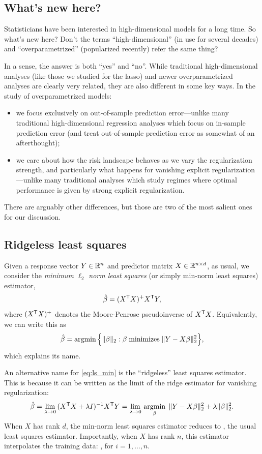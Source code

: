 \documentclass{article}
\begin{document}
\subsection{What's new here?}

Statisticians have been interested in high-dimensional models for a long
time. So what's new here? Don't the terms ``high-dimensional'' (in use for
several decades) and ``overparametrized'' (popularized recently) refer the same
thing?    

In a sense, the answer is both ``yes'' and ``no''. While traditional
high-dimensional analyses (like those we studied for the lasso) and newer
overparametrized analyses are clearly very related, they are also different in
some key ways. In the study of overparametrized models:
\begin{itemize}
\item we focus exclusively on out-of-sample prediction error---unlike many 
  traditional high-dimensional regression analyses which focus on in-sample
  prediction error (and treat out-of-sample prediction error as somewhat of an 
  afterthought);  
\item we care about how the risk landscape behaves as we vary the regularization  
  strength, and particularly what happens for vanishing explicit
  regularization---unlike many traditional analyses which study regimes where
  optimal performance is given by strong explicit regularization.   
\end{itemize}
There are arguably other differences, but those are two of the most salient ones 
for our discussion.

\subsection{Ridgeless least squares}

Given a response vector $Y \in \mathbb{R}^n$ and predictor matrix $X \in \mathbb{R}^{n \times
  d}$, as usual, we consider the \emph{minimum $\ell_2$ norm least squares} 
(or simply min-norm least squares) estimator,
\begin{equation}
\label{eq:ls_min}
\hat{\beta} = (X^{\mathsf{T}} X)^+ X^{\mathsf{T}} Y,
\end{equation}
where $(X^{\mathsf{T}} X)^+$ denotes the Moore-Penrose pseudoinverse of $X^{\mathsf{T}} X$.
Equivalently, we can write this as
\[
\hat{\beta} = \mathop{\mathrm{argmin}} \Big\{ \|\beta\|_2 : \beta \; \text{minimizes} \; \|Y - X
\beta\|_2^2 \Big\},   
\]
which explains its name.  

An alternative name for \eqref{eq:ls_min} is the ``ridgeless'' least squares
estimator. This is because it can be written as the limit of the ridge estimator
for vanishing regularization:  
\[
\hat{\beta} = \lim_{\lambda \to 0} \, (X^{\mathsf{T}} X + \lambda I)^{-1} X^{\mathsf{T}} Y =   
\lim_{\lambda \to 0} \, \mathop{\mathrm{argmin}}_\beta \; \|Y - X\beta\|_2^2 + \lambda 
\|\beta\|_2^2.   
\]
When $X$ has rank $d$, the min-norm least squares estimator reduces to
, the usual least squares estimator.
Importantly, when $X$ has rank $n$, this estimator interpolates the training 
data: , for $i=1,\dots,n$.   
\end{document}
